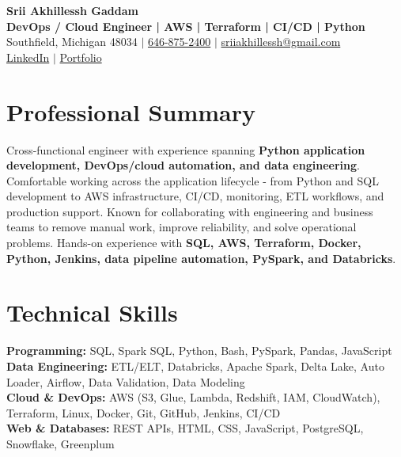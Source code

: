 \documentclass[letterpaper,10pt]{article}
\begin{document}
\fontsize{9.35pt}{10.45pt}\selectfont

\begin{center}
    {\LARGE \textbf{Srii Akhillessh Gaddam}} \\[-1pt]
    \textbf{DevOps / Cloud Engineer | AWS | Terraform | CI/CD | Python} \\[2pt]
    Southfield, Michigan 48034 $|$
    \href{tel:6468752400}{646-875-2400} $|$
    \href{mailto:sriiakhillessh@gmail.com}{sriiakhillessh@gmail.com} \\[1pt]
    \href{https://www.linkedin.com/in/srii-akhiilessh-gaddam-b48668191/}{LinkedIn} $|$
    \href{https://sriiakhillesshg.github.io/portfolio/}{Portfolio}
\end{center}
\vspace{-8pt}

\section{Professional Summary}
\small{Cross-functional engineer with experience spanning \textbf{Python application development, DevOps/cloud automation, and data engineering}. Comfortable working across the application lifecycle - from Python and SQL development to AWS infrastructure, CI/CD, monitoring, ETL workflows, and production support. Known for collaborating with engineering and business teams to remove manual work, improve reliability, and solve operational problems. Hands-on experience with \textbf{SQL, AWS, Terraform, Docker, Python, Jenkins, data pipeline automation, PySpark, and Databricks}.}

\section{Technical Skills}
\small{
\textbf{Programming:} SQL, Spark SQL, Python, Bash, PySpark, Pandas, JavaScript \\
\textbf{Data Engineering:} ETL/ELT, Databricks, Apache Spark, Delta Lake, Auto Loader, Airflow, Data Validation, Data Modeling \\
\textbf{Cloud \& DevOps:} AWS (S3, Glue, Lambda, Redshift, IAM, CloudWatch), Terraform, Linux, Docker, Git, GitHub, Jenkins, CI/CD \\
\textbf{Web \& Databases:} REST APIs, HTML, CSS, JavaScript, PostgreSQL, Snowflake, Greenplum
}
\end{document}
